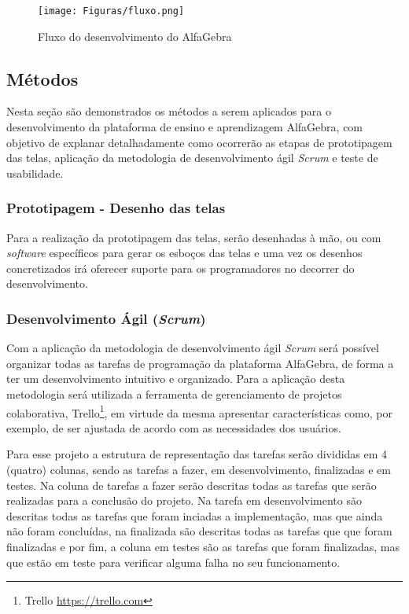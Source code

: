 \begin{figure}[!htb]
  \centering 
  \texttt{[image: Figuras/fluxo.png]}
  \caption{Fluxo do desenvolvimento do AlfaGebra}
  \label{fluxograma}
\end{figure}

\subsection{Métodos}
\noindent Nesta seção são demonstrados os métodos a serem aplicados para o desenvolvimento da plataforma de ensino e aprendizagem AlfaGebra, com objetivo de explanar detalhadamente como ocorrerão as etapas de prototipagem das telas, aplicação da metodologia de desenvolvimento ágil \textit{Scrum} e teste de usabilidade.

\subsubsection{Prototipagem - Desenho das telas}
\noindent Para a realização da prototipagem das telas, serão desenhadas à mão, ou com \textit{software} específicos para gerar os esboços das telas e uma vez os desenhos concretizados irá oferecer suporte para os programadores no decorrer do desenvolvimento. 

\subsubsection{Desenvolvimento Ágil (\textit{Scrum})}
\noindent Com a aplicação da metodologia de desenvolvimento ágil \textit{Scrum} será possível organizar todas as tarefas de programação da plataforma AlfaGebra, de forma a ter um desenvolvimento intuitivo e organizado. Para a aplicação desta metodologia será utilizada a ferramenta de gerenciamento de projetos colaborativa, Trello\footnote[9]{Trello \url{https://trello.com}}, em virtude da mesma apresentar características como, por exemplo, de ser ajustada de acordo com as necessidades dos usuários.

Para esse projeto a estrutura de representação das tarefas serão divididas em 4 (quatro) colunas, sendo as tarefas a fazer, em desenvolvimento, finalizadas e em testes. Na coluna de tarefas a fazer serão descritas todas as tarefas que serão realizadas para a conclusão do projeto. Na tarefa em desenvolvimento são descritas todas as tarefas que foram inciadas a implementação, mas que ainda não foram concluídas, na finalizada são descritas todas as tarefas que que foram finalizadas e por fim, a coluna em testes são as tarefas que foram finalizadas, mas que estão em teste para verificar alguma falha no seu funcionamento. 

